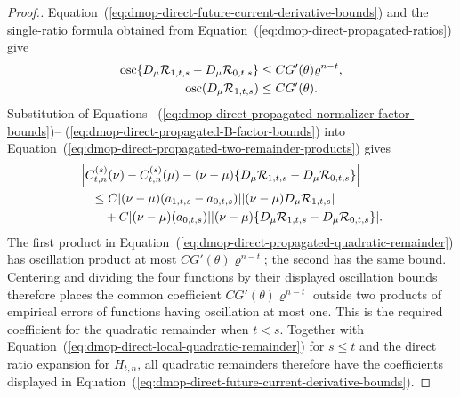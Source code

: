 \documentclass[11pt]{article}
\theoremstyle{thmstylethree}%
\begin{document}
\begin{proof}[Proof.]
Equation~(\ref{eq:dmop-direct-future-current-derivative-bounds}) and the
single-ratio formula obtained from
Equation~(\ref{eq:dmop-direct-propagated-ratios}) give
\begin{align}
\operatorname{osc}
\{D_\mu\mathcal R_{1,t,s}-D_\mu\mathcal R_{0,t,s}\}
&\leq CG'(\theta)\varrho^{n-t},                            \notag\\
\operatorname{osc}(D_\mu\mathcal R_{1,t,s})
&\leq CG'(\theta).
\label{eq:dmop-direct-propagated-B-factor-bounds}
\end{align}
Substitution of Equations~
(\ref{eq:dmop-direct-propagated-normalizer-factor-bounds})--
(\ref{eq:dmop-direct-propagated-B-factor-bounds}) into
Equation~(\ref{eq:dmop-direct-propagated-two-remainder-products}) gives
\begin{align}
&\left|
C_{t,n}^{(s)}(\nu)-C_{t,n}^{(s)}(\mu)
-(\nu-\mu)
\{D_\mu\mathcal R_{1,t,s}-D_\mu\mathcal R_{0,t,s}\}
\right|                                                     \notag\\
&\quad\leq
C|(\nu-\mu)(a_{1,t,s}-a_{0,t,s})|
|(\nu-\mu)D_\mu\mathcal R_{1,t,s}|                        \notag\\
&\qquad+
C|(\nu-\mu)(a_{0,t,s})|
|(\nu-\mu)
\{D_\mu\mathcal R_{1,t,s}-D_\mu\mathcal R_{0,t,s}\}|.
\label{eq:dmop-direct-propagated-quadratic-remainder}
\end{align}
The first product in
Equation~(\ref{eq:dmop-direct-propagated-quadratic-remainder}) has
oscillation product at most $CG'(\theta)\varrho^{n-t}$; the second has
the same bound.  Centering and dividing the four functions by their
displayed oscillation bounds therefore places the common coefficient
$CG'(\theta)\varrho^{n-t}$ outside two products of empirical errors of
functions having oscillation at most one.  This is the required
coefficient for the quadratic remainder when $t<s$.  Together with
Equation~(\ref{eq:dmop-direct-local-quadratic-remainder}) for $s\leq t$
and the direct ratio expansion for $H_{t,n}$, all quadratic remainders
therefore have the coefficients displayed in
Equation~(\ref{eq:dmop-direct-future-current-derivative-bounds}).


\end{proof}
\end{document}
